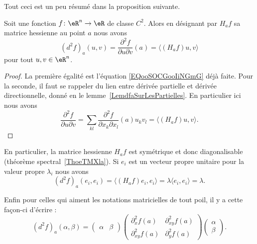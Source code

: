 Tout ceci est un peu résumé dans la proposition suivante.
\begin{proposition}     \label{PROPooFWZYooUQwzjW}
	Soit une fonction \( f\colon \eR^n\to \eR\) de classe \( C^2\). Alors en désignant par \( H_af\) sa matrice hessienne au point \( a\) nous avons
	\begin{equation}
		(d^2f)_a(u,v)=\frac{ \partial^2f }{ \partial u\partial v }(a)=\langle (H_af)u, v\rangle
	\end{equation}
	pour tout \( u,v\in \eR^n\).
\end{proposition}

\begin{proof}
	La première égalité est l'équation \eqref{EQooSOCGooIiNGmG} déjà faite. Pour la seconde, il faut se rappeler du lien entre dérivée partielle et dérivée directionnelle, donné en le lemme~\ref{LemdfaSurLesPartielles}. En particulier ici nous avons
	\begin{equation}
		\frac{ \partial^2f }{ \partial u\partial v }=\sum_{kl}\frac{ \partial^2f }{ \partial x_k\partial x_l  }(a)u_kv_l=\langle (H_af)u, v\rangle .
	\end{equation}
\end{proof}

En particulier, la matrice hessienne \( H_af\) est symétrique et donc diagonalisable (théorème spectral~\ref{ThoeTMXla}). Si \( e_i\) est un vecteur propre unitaire pour la valeur propre \( \lambda_i\) nous avons
\begin{equation}
	(d^2f)_a(e_i,e_i)=\langle (H_af)e_i, e_i\rangle =\lambda\langle e_i, e_i\rangle =\lambda.
\end{equation}

Enfin pour celles qui aiment les notations matricielles de tout poil, il y a cette façon-ci d'écrire :
\begin{equation}
	(d^2f)_a(\alpha,\beta)=\begin{pmatrix}
		\alpha & \beta
	\end{pmatrix}\begin{pmatrix}
		\partial^2_xf(a)    & \partial^2_{xy}f(a) \\
		\partial^2_{xy}f(a) & \partial^2_yf(a)
	\end{pmatrix}\begin{pmatrix}
		\alpha \\
		\beta
	\end{pmatrix}.
\end{equation}

